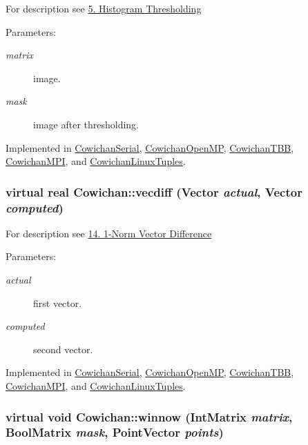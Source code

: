 For description see \hyperlink{index_thresh_sec}{5. Histogram Thresholding} \begin{Desc}
\item[Parameters:]
\begin{description}
\item[{\em matrix}]image. \item[{\em mask}]image after thresholding. \end{description}
\end{Desc}


Implemented in \hyperlink{class_cowichan_serial_7c0f93b2099ce919f91b5d953ff76511}{CowichanSerial}, \hyperlink{class_cowichan_open_m_p_e72c4c0a162f30eac37333bd28db97bc}{CowichanOpenMP}, \hyperlink{class_cowichan_t_b_b_3306d21f0b3d12cc2e3b050b99812a27}{CowichanTBB}, \hyperlink{class_cowichan_m_p_i_49ff96b091a61e9cfd9aad8824e7fbbd}{CowichanMPI}, and \hyperlink{class_cowichan_linux_tuples_b8cf055ec3d42a1ccde6d818c5a43a74}{CowichanLinuxTuples}.\hypertarget{class_cowichan_775d72b5e7d122f9f32555352278250e}{
\subsubsection[{vecdiff}]{\setlength{\rightskip}{0pt plus 5cm}virtual {\bf real} Cowichan::vecdiff ({\bf Vector} {\em actual}, \/  {\bf Vector} {\em computed})}}
\label{class_cowichan_775d72b5e7d122f9f32555352278250e}


For description see \hyperlink{index_vecdiff_sec}{14. 1-Norm Vector Difference} \begin{Desc}
\item[Parameters:]
\begin{description}
\item[{\em actual}]first vector. \item[{\em computed}]second vector. \end{description}
\end{Desc}


Implemented in \hyperlink{class_cowichan_serial_34b75a2084051b3677071bb3c334d1f4}{CowichanSerial}, \hyperlink{class_cowichan_open_m_p_92aa23ed47da0a5a3b43416ab08199b3}{CowichanOpenMP}, \hyperlink{class_cowichan_t_b_b_28c976743df231fd183e4db9306050b1}{CowichanTBB}, \hyperlink{class_cowichan_m_p_i_c5470a2876efecf843b19c37c21ecf19}{CowichanMPI}, and \hyperlink{class_cowichan_linux_tuples_213185666ea7dd0c9abc59899b454086}{CowichanLinuxTuples}.\hypertarget{class_cowichan_13d60e06ced3b5da79d62c133ce82337}{
\subsubsection[{winnow}]{\setlength{\rightskip}{0pt plus 5cm}virtual void Cowichan::winnow ({\bf IntMatrix} {\em matrix}, \/  {\bf BoolMatrix} {\em mask}, \/  {\bf PointVector} {\em points})}}
\label{class_cowichan_13d60e06ced3b5da79d62c133ce82337}


